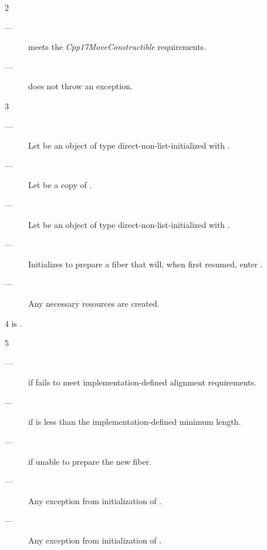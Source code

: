 2 \precond
\begin{description}
    \item[---]  meets the \emph{Cpp17MoveConstructible} requirements.
    \item[---]  does not throw an exception.
\end{description}

3 \effects
\begin{description}
    \item[---] Let  be an object of
               type  direct-non-list-initialized
               with . 
    \item[---] Let  be a copy of .
    \item[---] Let  be an object of
               type  direct-non-list-initialized
               with . 
    \item[---] Initializes  to prepare a fiber that will, when
               first resumed, enter .
    \item[---] Any necessary resources are created.
\end{description}

4 \postcond
\emptyfn is \false.

5 \except
\begin{description}
    \item[---]  if  fails to meet
               implementation-defined alignment requirements.
    \item[---]  if  is less than the
               implementation-defined minimum length.
    \item[---]  if unable to prepare the new fiber.
    \item[---] Any exception from initialization of .
    \item[---] Any exception from initialization of .
\end{description}

